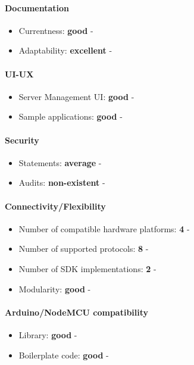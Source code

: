 \documentclass{article}
\begin{document}
\paragraph{Documentation}

\begin{itemize}
\item Currentness: \textbf{good} - 
\item Adaptability: \textbf{excellent} - 
\end{itemize}

\paragraph{UI-UX}

\begin{itemize}
\item Server Management UI: \textbf{good} - 
\item Sample applications: \textbf{good} - 
\end{itemize}

\paragraph{Security} 

\begin{itemize}
\item Statements: \textbf{average} - 
\item Audits: \textbf{non-existent} - 
\end{itemize}

\paragraph{Connectivity/Flexibility}

\begin{itemize}
\item Number of compatible hardware platforms: \textbf{4} - 
\item Number of supported protocols: \textbf{8} - 
\item Number of SDK implementations: \textbf{2} - 
\item Modularity: \textbf{good} - 
\end{itemize}

\paragraph{Arduino/NodeMCU compatibility}

\begin{itemize}
\item Library: \textbf{good} - 
\item Boilerplate code: \textbf{good} - 
\end{itemize}
\end{document}
